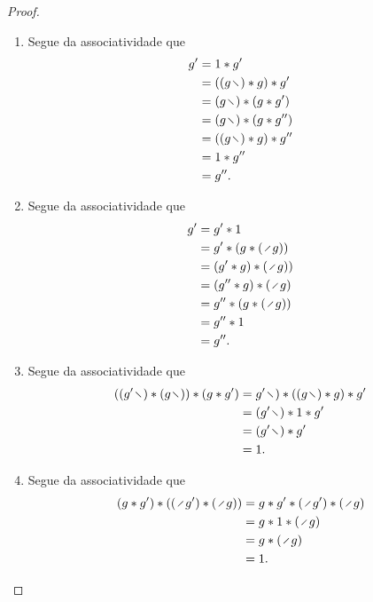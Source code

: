 \begin{proof}
	\begin{enumerate}
	\item Segue da associatividade que
		\begin{align*}
		g' &= 1 \opb g' \\
			&= ((g \vid) \opb g) \opb g' \\
			&= (g \vid) \opb (g \opb g') \\
			&= (g \vid) \opb (g \opb g'') \\
			&= ((g \vid) \opb g) \opb g'' \\
			&= 1 \opb g'' \\
			&= g''.
		\end{align*}
	\item Segue da associatividade que
		\begin{align*}
		g' &= g' \opb 1 \\
			&= g' \opb (g \opb (\div g)) \\
			&= (g' \opb g) \opb (\div g)) \\
			&= (g'' \opb g) \opb (\div g) \\
			&= g'' \opb (g \opb (\div g)) \\
			&= g'' \opb 1 \\
			&= g''.
		\end{align*}
	\item Segue da associatividade que
		\begin{align*}
		((g' \vid) \opb (g \vid)) \opb (g \opb g') &= g' \vid) \opb ((g \vid) \opb g) \opb g' \\
			&= (g' \vid) \opb 1 \opb g' \\
			&= (g' \vid) \opb g' \\
			&= 1.
		\end{align*}
	\item Segue da associatividade que
		\begin{align*}
		(g \opb g') \opb ((\div g') \opb (\div g)) &= g \opb g' \opb (\div g') \opb (\div g) \\
			&= g \opb 1 \opb (\div g) \\
			&= g \opb (\div g) \\
			&= 1.
			\qedhere
		\end{align*}
	\end{enumerate}
\end{proof}

